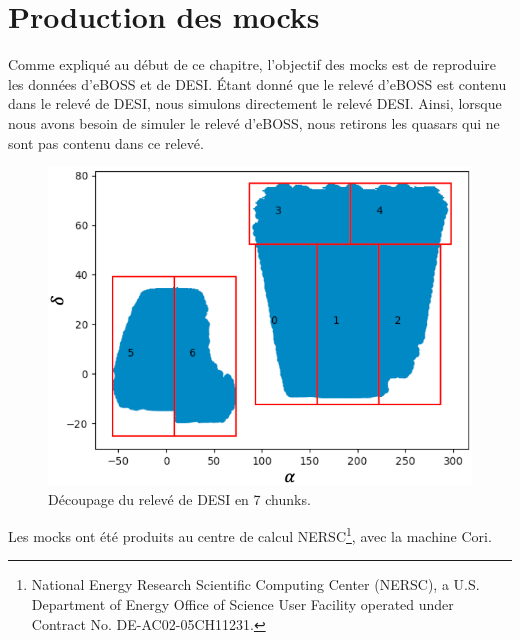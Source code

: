 \section{Production des mocks}
Comme expliqué au début de ce chapitre, l'objectif des mocks est de reproduire les données d'eBOSS et de DESI. Étant donné que le relevé d'eBOSS est contenu dans le relevé de DESI, nous simulons directement le relevé DESI. Ainsi, lorsque nous avons besoin de simuler le relevé d'eBOSS, nous retirons les quasars qui ne sont pas contenu dans ce relevé.
\begin{figure}
  \centering
  \includegraphics[scale=0.5]{chunks}
  \caption{Découpage du relevé de DESI en 7 chunks.}
  \label{fig:chunks}
\end{figure}
Les mocks ont été produits au centre de calcul NERSC\footnote{National Energy Research Scientific Computing Center (NERSC), a U.S. Department of Energy Office of Science User Facility operated under Contract No. DE-AC02-05CH11231.}, avec la machine Cori.
